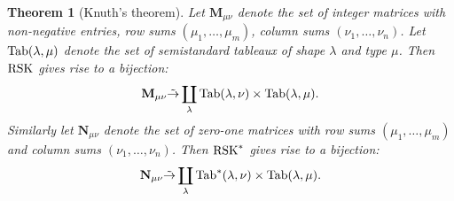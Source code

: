 \documentclass[11pt]{amsproc}
\newtheorem{theorem}{Theorem}[subsection]
\theoremstyle{definition}
\theoremstyle{example}
\newcommand{\Tab}{\textup{Tab}}
\newcommand{\rsk}{\textup{RSK}}
\begin{document}
\begin{theorem}
  [Knuth's theorem]
  \label{theorem:knuth}
  Let $\mathbf M_{\mu\nu}$ denote the set of integer matrices with non-negative entries, row sums $(\mu_1,\dotsc, \mu_m)$, column sums $(\nu_1,\dotsc,\nu_n)$.
  Let $\Tab(\lambda,\mu)$ denote the set of semistandard tableaux of shape $\lambda$ and type $\mu$.
  Then $\rsk$ gives rise to a bijection:
  \begin{equation}
    \label{eq:rsk}
    \mathbf M_{\mu\nu}\tilde\to \coprod_\lambda \Tab(\lambda,\nu)\times \Tab(\lambda,\mu).
  \end{equation}
  Similarly let $\mathbf N_{\mu\nu}$ denote the set of zero-one matrices with row sums $(\mu_1,\dotsc, \mu_m)$ and column sums $(\nu_1,\dotsc,\nu_n)$.
  Then $\rsk^*$ gives rise to a bijection:
  \begin{equation}
    \label{eq:drsk}
    \mathbf N_{\mu\nu}\tilde\to \coprod_\lambda \Tab^*(\lambda,\nu)\times \Tab(\lambda,\mu).
  \end{equation}
\end{theorem}
\end{document}
